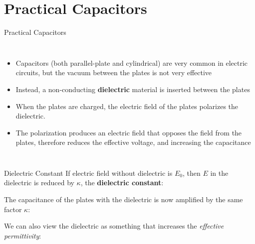 \documentclass[12pt,aspectratio=169]{beamer}
\begin{document}
\section{Practical Capacitors}

\begin{frame}{Practical Capacitors}
  \begin{columns}

    \begin{itemize}
    \item Capacitors (both parallel-plate and cylindrical) are very common in
      electric circuits, but the vacuum between the plates is not very effective
    \item Instead, a non-conducting \textbf{dielectric} material is inserted
      between the plates
    \item When the plates are charged, the electric field of the plates
      polarizes the dielectric.
    \item The polarization  produces an electric field that opposes the field
      from the plates, therefore reduces the effective voltage, and increasing
      the capacitance
    \end{itemize}
  \end{columns}
\end{frame}



\begin{frame}{Dielectric Constant}
  If electric field without dielectric is $E_0$, then $E$ in the dielectric is
  reduced by $\kappa$, the \textbf{dielectric constant}:


  The capacitance of the plates with the dielectric is now amplified by the
  same factor $\kappa$:


  We can also view the dielectric as something that increases the
  \emph{effective permittivity}:
  
\end{frame}
\end{document}
